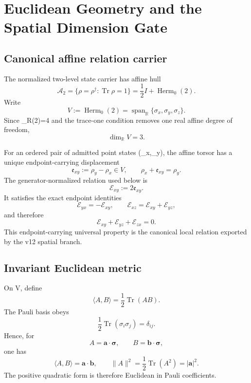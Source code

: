 \documentclass[11pt,a4paper,twoside]{book}
\def\({}%
\def\){}%
\theoremstyle{definition}
\begin{document}
\clearpage

\chapter{Euclidean Geometry and the Spatial Dimension Gate}
\label{ch:v12_euclidean_dimension}

\section{Canonical affine relation carrier}

The normalized two-level state carrier has affine hull
\[
\mathcal A_2
=
\{\rho=\rho^\dagger:\operatorname{Tr}\rho=1\}
=
\frac12I+\operatorname{Herm}_0(2).
\]
Write
\[
V:=\operatorname{Herm}_0(2)
=
\operatorname{span}_{\mathbb R}\{\sigma_x,\sigma_y,\sigma_z\}.
\]
Since \(\dim_{\mathbb R}(2)=4\) and the trace-one condition removes one
real affine degree of freedom,
\[
\boxed{\dim_{\mathbb R}V=3.}
\]

For an ordered pair of admitted point states \((\rho_x,\rho_y)\), the affine torsor
has a unique endpoint-carrying displacement
\[
\boxed{\mathfrak e_{xy}:=\rho_y-\rho_x\in V},
\qquad
\rho_x+\mathfrak e_{xy}=\rho_y.
\]
The generator-normalized relation used below is
\[
\boxed{\mathcal E_{xy}:=2\mathfrak e_{xy}.}
\]
It satisfies the exact endpoint identities
\[
\mathcal E_{yx}=-\mathcal E_{xy},
\qquad
\boxed{\mathcal E_{xz}=\mathcal E_{xy}+\mathcal E_{yz}},
\]
and therefore
\[
\mathcal E_{xy}+\mathcal E_{yz}+\mathcal E_{zx}=0.
\]
This endpoint-carrying universal property is the canonical local relation exported
by the v12 spatial branch.

\section{Invariant Euclidean metric}

On \(V\), define
\[
\boxed{
\langle A,B\rangle
=
\frac12\operatorname{Tr}(AB).
}
\]
The Pauli basis obeys
\[
\frac12\operatorname{Tr}(\sigma_i\sigma_j)=\delta_{ij}.
\]
Hence, for
\[
A=\mathbf a\cdot\boldsymbol\sigma,
\qquad
B=\mathbf b\cdot\boldsymbol\sigma,
\]
one has
\[
\boxed{
\langle A,B\rangle=\mathbf a\cdot\mathbf b,
\qquad
\|A\|^2=\frac12\operatorname{Tr}(A^2)=|\mathbf a|^2.
}
\]
The positive quadratic form is therefore Euclidean in Pauli coefficients.
\end{document}
